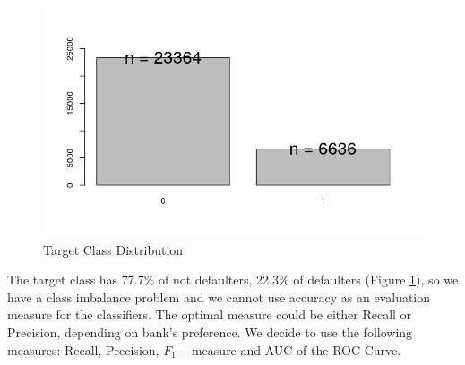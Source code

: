 \documentclass[fleqn,10pt]{SelfArx} %
\begin{document}
	\begin{figure}[h]
	\includegraphics[width=\linewidth]{class.png}
	\caption{Target Class Distribution}
	\label{fig:class}
	\end{figure}

The target class has 77.7\% of not defaulters, 22.3\% of defaulters (Figure \ref{fig:class}), so we have a class imbalance problem and we cannot use accuracy as an evaluation measure for the classifiers.
The optimal measure could be either Recall or Precision, depending on bank's preference.
We decide to use the following measures: Recall, Precision, $F_1-$measure and AUC of the ROC Curve.


\begin{table}[h]
\caption{Evaluation measures using Holdout}
\label{table:holdout}
\end{table}
\end{document}
